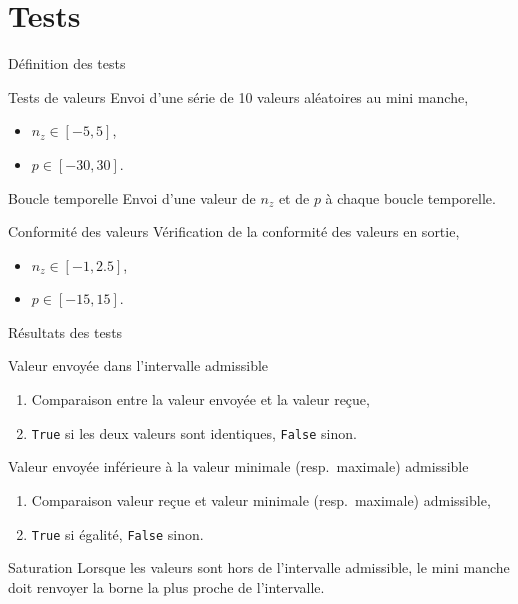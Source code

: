 \documentclass[footheight=2em]{beamer}
\begin{document}
\section{Tests}
\begin{frame}[t]{Définition des tests}
  \begin{block}{Tests de valeurs}
    Envoi d'une série de 10 valeurs aléatoires au mini manche,
    \begin{itemize}
      \item \(n_z \in [-5, 5]\),
      \item \(p \in [-30, 30]\).
    \end{itemize}
  \end{block}
  \begin{block}{Boucle temporelle}
    Envoi d'une valeur de \(n_z\) et de \(p\) à chaque boucle temporelle.
  \end{block}
  \begin{block}{Conformité des valeurs}
    Vérification de la conformité des valeurs en sortie,
    \begin{itemize}
      \item \(n_z \in [-1, 2.5]\),
      \item \(p \in [-15, 15]\).
    \end{itemize}
  \end{block}
\end{frame}

\begin{frame}[t]{Résultats des tests}
  \begin{block}{Valeur envoyée dans l'intervalle admissible}
    \begin{enumerate}
      \item Comparaison entre la valeur envoyée et la valeur reçue,
      \item \texttt{True} si les deux valeurs sont identiques, \texttt{False}
        sinon.
    \end{enumerate}
  \end{block}
  \pause
  \begin{block}{Valeur envoyée inférieure à la valeur minimale (resp.\
      maximale) admissible}
    \begin{enumerate}
      \item Comparaison valeur reçue et valeur minimale (resp.\ maximale)
        admissible,
      \item \texttt{True} si égalité, \texttt{False} sinon.
    \end{enumerate}
  \end{block}
  \pause
  \begin{block}{Saturation}
    Lorsque les valeurs sont hors de l'intervalle admissible, le mini manche doit
    renvoyer la borne la plus proche de l'intervalle.
  \end{block}
\end{frame}
\end{document}
